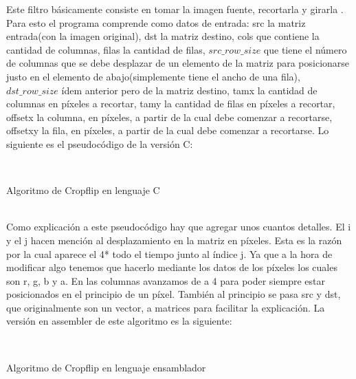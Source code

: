 ﻿\documentclass[a4paper]{article}
\begin{document}
	Este filtro b\'asicamente consiste en tomar la imagen fuente, recortarla y girarla . Para esto el programa comprende como datos de entrada: src la matriz entrada(con la imagen original), dst la matriz destino, cols que contiene la cantidad de columnas, filas la cantidad de filas, $src\_row\_size$ que tiene el n\'umero de columnas que se debe desplazar de un elemento de la matriz para posicionarse justo en el elemento de abajo(simplemente tiene el ancho de una fila), $dst\_row\_size$ \'idem anterior pero de la matriz destino, tamx la cantidad de columnas en píxeles a recortar, tamy la cantidad de filas en píxeles a recortar, offsetx la columna, en p\'ixeles, a partir de la cual debe comenzar a recortarse, offsetxy la fila, en p\'ixeles, a partir de la cual debe comenzar a recortarse. Lo siguiente es el pseudoc\'odigo de la versión C:
\ \\
\begin{algorithm}[H]
\ \\

\caption{Algoritmo de Cropflip en lenguaje C}
\end{algorithm}	
\ \\
	Como explicaci\'on a este pseudocódigo hay que agregar unos cuantos detalles. El i y el j hacen menci\'on al desplazamiento en la matriz en píxeles. Esta es la raz\'on por la cual aparece el 4* todo el tiempo junto al \'indice j. Ya que a la hora de modificar algo tenemos que hacerlo mediante los datos de los píxeles los cuales son r, g, b y a. En las columnas avanzamos de a 4 para poder siempre estar posicionados en el principio de un píxel. Tambi\'en al principio se pasa src y dst, que originalmente son un vector, a matrices para facilitar la explicaci\'on. La versi\'on en assembler de este algoritmo es la siguiente:	
\ \\
\begin{algorithm}[H]
\ \\
\caption{Algoritmo de Cropflip en lenguaje ensamblador}
\end{algorithm}	
\ \\
\end{document}
